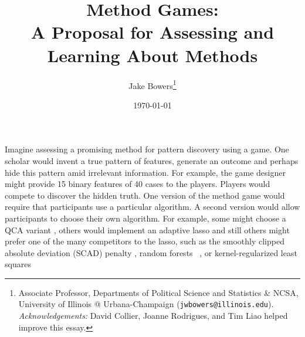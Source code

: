 \documentclass[12pt]{article}
\title{Method Games:\\ A Proposal for Assessing and Learning About Methods}
\author{Jake Bowers\thanks{Associate Professor, Departments of Political
    Science and Statistics \& NCSA, University of Illinois @ Urbana-Champaign
    (\texttt{jwbowers@illinois.edu}).  \textit{Acknowledgements:}  David
    Collier, Joanne Rodrigues, and Tim Liao helped improve this essay.}
}
\date{\today}
\begin{document}
\begin{titlepage}
\maketitle
\end{titlepage}


Imagine assessing a promising method for pattern discovery using a game.  One
scholar would invent a true pattern of features, generate an outcome and
perhaps hide this pattern amid irrelevant information.  For example, the game
designer might provide 15 binary features of 40 cases to the players. Players
would compete to discover the hidden truth.  One version of the method game
would require that participants use a particular algorithm. A second version
would allow participants to choose their own algorithm. For example, some
might choose a QCA variant \citep{rihoux2008configurational}, others would
implement an adaptive lasso \citep{zou2006adaptive} and still others might
prefer one of the many competitors to the lasso, such as the smoothly clipped
absolute deviation (SCAD) penalty \citep{fan2001variable}, random forests
~\citep{breiman2001random}, or kernel-regularized least squares
\end{document}
